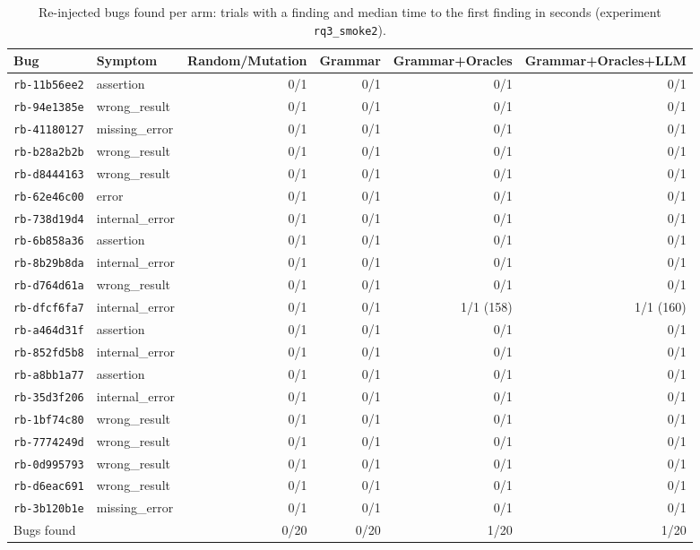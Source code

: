 \begin{table}[t]
  \centering
  \small
  \caption{Re-injected bugs found per arm: trials with a finding and median time to the first finding in seconds (experiment \texttt{rq3\_smoke2}).}
  \label{tab:rq3}
  \begin{tabular}{llrrrr}
    \toprule
    Bug & Symptom & Random/Mutation & Grammar & Grammar+Oracles & Grammar+Oracles+LLM \\
    \midrule
    \texttt{rb-11b56ee2} & assertion & 0/1 & 0/1 & 0/1 & 0/1 \\
    \texttt{rb-94e1385e} & wrong\_result & 0/1 & 0/1 & 0/1 & 0/1 \\
    \texttt{rb-41180127} & missing\_error & 0/1 & 0/1 & 0/1 & 0/1 \\
    \texttt{rb-b28a2b2b} & wrong\_result & 0/1 & 0/1 & 0/1 & 0/1 \\
    \texttt{rb-d8444163} & wrong\_result & 0/1 & 0/1 & 0/1 & 0/1 \\
    \texttt{rb-62e46c00} & error & 0/1 & 0/1 & 0/1 & 0/1 \\
    \texttt{rb-738d19d4} & internal\_error & 0/1 & 0/1 & 0/1 & 0/1 \\
    \texttt{rb-6b858a36} & assertion & 0/1 & 0/1 & 0/1 & 0/1 \\
    \texttt{rb-8b29b8da} & internal\_error & 0/1 & 0/1 & 0/1 & 0/1 \\
    \texttt{rb-d764d61a} & wrong\_result & 0/1 & 0/1 & 0/1 & 0/1 \\
    \texttt{rb-dfcf6fa7} & internal\_error & 0/1 & 0/1 & 1/1 (158) & 1/1 (160) \\
    \texttt{rb-a464d31f} & assertion & 0/1 & 0/1 & 0/1 & 0/1 \\
    \texttt{rb-852fd5b8} & internal\_error & 0/1 & 0/1 & 0/1 & 0/1 \\
    \texttt{rb-a8bb1a77} & assertion & 0/1 & 0/1 & 0/1 & 0/1 \\
    \texttt{rb-35d3f206} & internal\_error & 0/1 & 0/1 & 0/1 & 0/1 \\
    \texttt{rb-1bf74c80} & wrong\_result & 0/1 & 0/1 & 0/1 & 0/1 \\
    \texttt{rb-7774249d} & wrong\_result & 0/1 & 0/1 & 0/1 & 0/1 \\
    \texttt{rb-0d995793} & wrong\_result & 0/1 & 0/1 & 0/1 & 0/1 \\
    \texttt{rb-d6eac691} & wrong\_result & 0/1 & 0/1 & 0/1 & 0/1 \\
    \texttt{rb-3b120b1e} & missing\_error & 0/1 & 0/1 & 0/1 & 0/1 \\
    \midrule
    Bugs found & & 0/20 & 0/20 & 1/20 & 1/20 \\
    \bottomrule
  \end{tabular}
\end{table}
